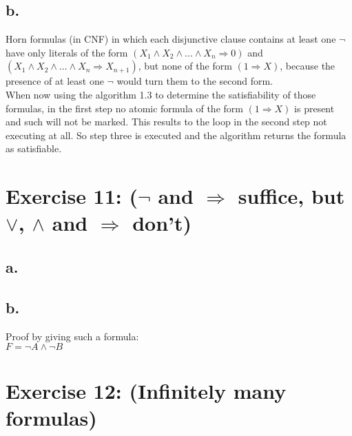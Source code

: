 \documentclass[12pt]{article}
\begin{document}
\subsection*{b.}

Horn formulas (in CNF) in which each disjunctive clause contains at least one $\neg$ have only literals of the form $(X_1 \land X_2 \land ... \land X_n \Rightarrow 0)$ and $(X_1 \land X_2 \land ...  \land X_n \Rightarrow X_{n+1})$, but none of the form $(1 \Rightarrow X)$, because the presence of at least one $\neg$ would turn them to the second form.\\
When now using the algorithm 1.3 to determine the satisfiability of those formulas, in the first step no atomic formula of the form $(1 \Rightarrow X)$ is present and such will not be marked. This results to the loop in the second step not executing at all. So step three is executed and the algorithm returns the formula as satisfiable.

\section*{Exercise 11:  ($\neg$ and $\Rightarrow$ suffice, but $\lor$, $\land$ and $\Rightarrow$ don’t)}

\subsection*{a.}

\subsection*{b.}

Proof by giving such a formula:\\
$F = \neg A \land \neg B$

\section*{Exercise 12: (Infinitely many formulas)}

\end{document}
